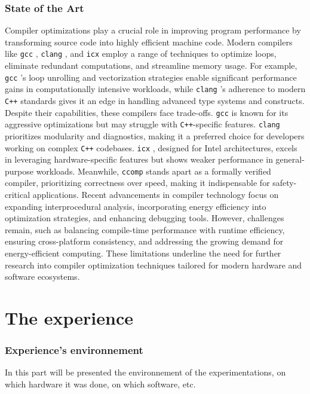 \documentclass{rapport}
\newcommand{\gcc}{\texttt{gcc} }
\newcommand{\icx}{\texttt{icx} }
\newcommand{\clang}{\texttt{clang} }
\newcommand{\comp}{\texttt{ccomp} }
\begin{document}
\section*{State of the Art}
Compiler optimizations play a crucial role in improving program performance by transforming source code into highly efficient machine code. Modern compilers like \gcc, \clang, and \icx 
employ a range of techniques to optimize loops, eliminate redundant computations, and streamline memory usage. For example, \gcc’s loop unrolling and vectorization strategies enable 
significant performance gains in computationally intensive workloads, while \clang’s adherence to modern \texttt{C++} standards gives it an edge in handling advanced type systems and 
constructs.
\newline\newline
Despite their capabilities, these compilers face trade-offs. \gcc is known for its aggressive optimizations but may struggle with \texttt{C++}-specific features. \clang prioritizes 
modularity and diagnostics, making it a preferred choice for developers working on complex \texttt{C++} codebases. \icx, designed for Intel architectures, excels in leveraging 
hardware-specific features but shows weaker performance in general-purpose workloads. Meanwhile, \comp stands apart as a formally verified compiler, prioritizing correctness over speed, 
making it indispensable for safety-critical applications.
\newline\newline
Recent advancements in compiler technology focus on expanding interprocedural analysis, incorporating energy efficiency into optimization strategies, and enhancing debugging tools. 
However, challenges remain, such as balancing compile-time performance with runtime efficiency, ensuring cross-platform consistency, and addressing the growing demand for 
energy-efficient computing. These limitations underline the need for further research into compiler optimization techniques tailored for modern hardware and software ecosystems.
\clearpage

\part{The experience}

\section{Experience's environnement}
In this part will be presented the environnement of the experimentations, on which hardware it was done, on which software, etc.
\end{document}
